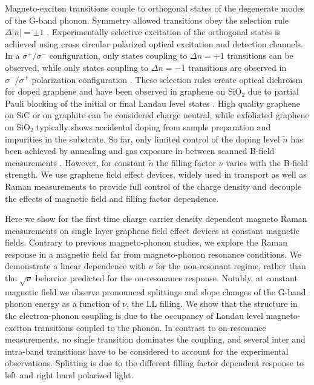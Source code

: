 \documentclass[prl,aps,superscriptaddress,showpacs,reprint]{revtex4-1}
\begin{document}
Magneto-exciton transitions couple to orthogonal states of the degenerate modes of the G-band phonon. Symmetry allowed transitions obey the selection rule $\Delta\left|n\right|=\pm 1$ \cite{PhysRevB.84.235138}. Experimentally selective excitation of the orthogonal states is achieved using cross circular polarized optical excitation and detection channels. In a $\sigma^+/\sigma^-$ configuration, only states coupling to $\Delta n=+1$ transitions can be observed, while only states coupling to $\Delta n=-1$ transitions are observed in $\sigma^-/\sigma^+$ polarization configuration \cite{kossacki2012circular,PhysRevLett.110.227402,PhysRevB.84.235138,kuhne2012polarization}.
These selection rules create optical dichroism for doped graphene \cite{goerbig2007filling,ando2007magnetic} and have been observed in graphene on SiO$_2$ due to partial Pauli blocking of the initial or final Landau level states \cite{PhysRevLett.110.227402,kossacki2012circular}. 
High quality graphene on SiC or on graphite can be considered charge neutral, while exfoliated graphene on SiO$_2$ typically shows accidental doping from sample preparation and impurities in the substrate. So far, only limited control of the doping level $\widetilde{n}$ has been achieved by annealing and gas exposure in between scanned B-field measurements \cite{PhysRevLett.110.227402}. However, for constant $\widetilde{n}$ the filling factor $\nu$ varies with the B-field strength. We use graphene field effect devices, widely used in transport \cite{novoselov2004electric,novoselov2005two,zhang2005experimental} as well as Raman measurements \cite{pisana2007breakdown,yan2007electric,stampfer2007raman} to provide full control of the charge density and decouple the effects of magnetic field and filling factor dependence.

Here we show for the first time charge carrier density dependent magneto Raman measurements on single layer graphene field effect devices at constant magnetic fields. Contrary to previous magneto-phonon studies, we explore the Raman response in a magnetic field far from magneto-phonon resonance conditions. We demonstrate a linear dependence with $\nu$ for the non-resonant regime, rather than the $\sqrt{\nu}$ behavior predicted for the on-resonance response. Notably, at constant magnetic field we observe pronounced splittings and slope changes of the G-band phonon energy as a function of $\nu$, the LL filling. We show that the structure in the electron-phonon coupling is due to the occupancy of Landau level magneto-exciton transitions coupled to the phonon. In contrast to on-resonance measurements, no single transition dominates the coupling, and several inter and intra-band transitions have to be considered to account for the experimental observations. Splitting is due to the different filling factor dependent response to left and right hand polarized light.   
\end{document}
